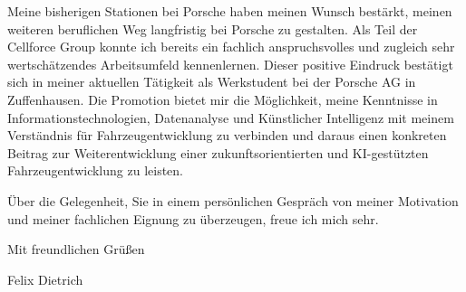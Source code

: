 \documentclass[11pt]{article}
\begin{document}
Meine bisherigen Stationen bei Porsche haben meinen Wunsch bestärkt, meinen weiteren beruflichen Weg langfristig bei Porsche zu gestalten. Als Teil der Cellforce Group konnte ich bereits ein fachlich anspruchsvolles und zugleich sehr wertschätzendes Arbeitsumfeld kennenlernen. Dieser positive Eindruck bestätigt sich in meiner aktuellen Tätigkeit als Werkstudent bei der Porsche AG in Zuffenhausen. Die Promotion bietet mir die Möglichkeit, meine Kenntnisse in Informationstechnologien, Datenanalyse und Künstlicher Intelligenz mit meinem Verständnis für Fahrzeugentwicklung zu verbinden und daraus einen konkreten Beitrag zur Weiterentwicklung einer zukunftsorientierten und KI-gestützten Fahrzeugentwicklung zu leisten.

Über die Gelegenheit, Sie in einem persönlichen Gespräch von meiner Motivation und meiner fachlichen Eignung zu überzeugen, freue ich mich sehr.

\bigskip

Mit freundlichen Grüßen

\medskip

Felix Dietrich
\end{document}
